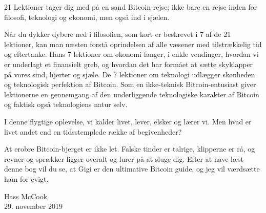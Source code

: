21 Lektioner tager dig med på en sand Bitcoin-rejse; ikke bare en rejse inden 
for filosofi, teknologi og økonomi, men også ind i sjælen.

Når du dykker dybere ned i filosofien, som kort er beskrevet i 7 af de 21 
lektioner, kan man næsten forstå oprindelsen af alle væsener med tilstrækkelig 
tid og eftertanke. Hans 7 lektioner om økonomi fanger, i enkle vendinger, 
hvordan vi er underlagt et finansielt greb, og hvordan det har formået at sætte 
skyklapper på vores sind, hjerter og sjæle. De 7 lektioner om teknologi udlægger 
skønheden og teknologisk perfektion af Bitcoin. Som en ikke-teknisk 
Bitcoin-entusiast giver lektionerne en gennemgang af den underliggende 
teknologiske karakter af Bitcoin og faktisk også teknologiens natur selv.

I denne flygtige oplevelse, vi kalder livet, lever, elsker og lærer vi. Men hvad 
er livet andet end en tidsstemplede række af begivenheder?

At erobre Bitcoin-bjerget er ikke let. Falske tinder er talrige, klipperne er 
rå, og revner og sprækker ligger overalt og lurer på at sluge dig. Efter at have 
læst denne bog vil du se, at Gigi er den ultimative Bitcoin guide, og jeg vil 
værdsætte ham for evigt.

\begin{flushright}
  Hass McCook \\
  29. november 2019
\end{flushright}

